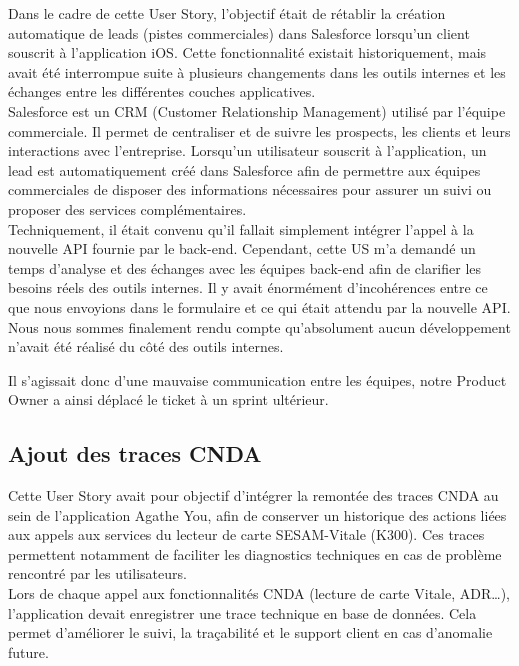 \documentclass{article}
\begin{document}
Dans le cadre de cette User Story, l'objectif était de rétablir la création automatique de leads (pistes commerciales) dans Salesforce lorsqu'un client souscrit à l'application iOS. Cette fonctionnalité existait historiquement, mais avait été interrompue suite à plusieurs changements dans les outils internes et les échanges entre les différentes couches applicatives. \\

Salesforce est un CRM (Customer Relationship Management) utilisé par l'équipe commerciale. Il permet de centraliser et de suivre les prospects, les clients et leurs interactions avec l'entreprise. Lorsqu'un utilisateur souscrit à l'application, un lead est automatiquement créé dans Salesforce afin de permettre aux équipes commerciales de disposer des informations nécessaires pour assurer un suivi ou proposer des services complémentaires. \\

Techniquement, il était convenu qu'il fallait simplement intégrer l'appel à la nouvelle API fournie par le back-end. Cependant, cette US m'a demandé un temps d'analyse et des échanges avec les équipes back-end afin de clarifier les besoins réels des outils internes. Il y avait énormément d'incohérences entre ce que nous envoyions dans le formulaire et ce qui était attendu par la nouvelle API. Nous nous sommes finalement rendu compte qu'absolument aucun développement n'avait été réalisé du côté des outils internes.

Il s'agissait donc d'une mauvaise communication entre les équipes, notre Product Owner a ainsi déplacé le ticket à un sprint ultérieur.

\subsection{Ajout des traces CNDA}

Cette User Story avait pour objectif d'intégrer la remontée des traces CNDA au sein de l'application Agathe You, afin de conserver un historique des actions liées aux appels aux services du lecteur de carte SESAM-Vitale (K300). Ces traces permettent notamment de faciliter les diagnostics techniques en cas de problème rencontré par les utilisateurs. \\

Lors de chaque appel aux fonctionnalités CNDA (lecture de carte Vitale, ADR…), l'application devait enregistrer une trace technique en base de données. Cela permet d'améliorer le suivi, la traçabilité et le support client en cas d'anomalie future.
\end{document}
